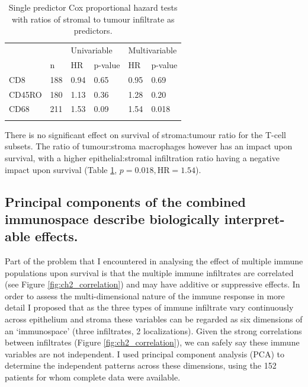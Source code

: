 \begin{table}[ht]
\centering
\begin{tabular}{llllll} \hline
 	&		&	\multicolumn{2}{l}{Univariable}			&	\multicolumn{2}{l}{Multivariable}			\\
 	    &	n	&	HR	&	p-value	    &	HR	&	p-value	\\ \hline
CD8	    &	188	&	0.94	&	0.65	&	0.95	&	0.69	\\
CD45RO	&	180	&	1.13	&	0.36	&	1.28	&	0.20	\\
CD68	&	211	&	1.53	&	0.09	&	1.54	&	0.018	\\

   \hline
\multicolumn{5}{l}{}\\
\end{tabular}
\caption[Cox regression for ratio of Tumour to Stroma infiltrate]{Single predictor Cox proportional hazard tests with ratios of stromal to tumour infiltrate as predictors.} 
\label{tab:s:t}
\end{table}
There is no significant effect on survival of stroma:tumour ratio for the T-cell subsets. The ratio of tumour:stroma macrophages however has an impact upon survival, with a higher epithelial:stromal infiltration ratio having a negative impact upon survival (Table \ref{tab:s:t}, $p=0.018, \mathrm{HR}=1.54$).

\subsection{Principal components of the combined immunospace describe biologically interpret-able effects.}
 Part of the problem that I encountered in analysing the effect of multiple immune populations upon survival is that the multiple immune infiltrates are correlated (see Figure \ref{fig:ch2_correlation}) and may have additive or suppressive effects.  In order to assess the multi-dimensional nature of the immune response in more detail I proposed that as the three types of immune infiltrate vary continuously across epithelium and stroma these variables can be regarded as six dimensions of an ‘immunospace’ (three infiltrates, 2 localizations).  Given the strong correlations between infiltrates (Figure \ref{fig:ch2_correlation}), we can safely say these immune variables are not independent. I used principal component analysis (PCA) to determine the independent patterns across these dimensions, using the 152 patients for whom complete data were available.
 
